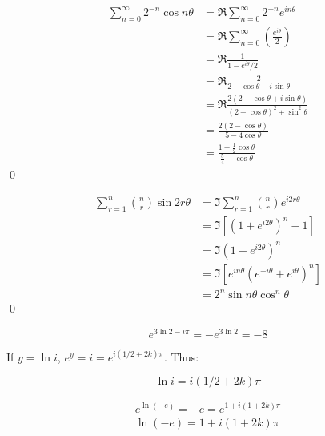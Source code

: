 \documentclass[12pt]{article}
\begin{document}
\begin{equation}
    \begin{split}
        \sum_{n=0}^{\infty} 2^{-n} \cos{n\theta} &= \Re \sum_{n=0}^{\infty} 2^{-n} e^{in\theta} \\
        &= \Re \sum_{n=0}^{\infty} \left( \frac{e^{i\theta}}{2} \right) \\
        &= \Re \frac{1}{1 - e^{i\theta}/2} \\
        &= \Re \frac{2}{2 - \cos{\theta} - i\sin{\theta}} \\
        &= \Re \frac{2(2 - \cos{\theta} + i\sin{\theta})}{(2 - \cos{\theta})^{2} + \sin^{2}{\theta}} \\
        &= \frac{2(2 - \cos{\theta})}{5 - 4\cos{\theta}} \\
        &= \frac{1 - \frac{1}{2}\cos{\theta}}{\frac{5}{4} - \cos{\theta}}
    \end{split}
\end{equation}
\qed



\begin{equation}
    \begin{split}
        \sum_{r = 1}^{n} \binom{n}{r} \sin{2r \theta} &= \Im \sum_{r = 1}^{n} \binom{n}{r} e^{i2r\theta} \\
        &= \Im \left[ \left( 1 + e^{i2\theta} \right)^{n} - 1 \right] \\
        &= \Im \left( 1 + e^{i2\theta} \right)^{n} \\
        &= \Im \left[ e^{in\theta} \left( e^{-i\theta} + e^{i\theta} \right)^{n} \right] \\
        &= 2^{n} \sin{n\theta} \cos^{n}{\theta}
    \end{split}
\end{equation}
\qed




\begin{equation}
    e^{3\ln{2} - i\pi} = -e^{3\ln{2}} = -8
\end{equation}

If $y = \ln{i}$, $e^{y} = i = e^{i(1/2 + 2k)\pi}$. Thus:

\begin{equation}
    \ln{i} = i(1/2 + 2k)\pi
\end{equation}


\begin{equation}
    \begin{split}
        e^{\ln{(-e)}} = -e = e^{1 + i(1 + 2k)\pi} \\
        \ln{(-e)} = 1 + i(1 + 2k)\pi
    \end{split}
\end{equation}
\end{document}
